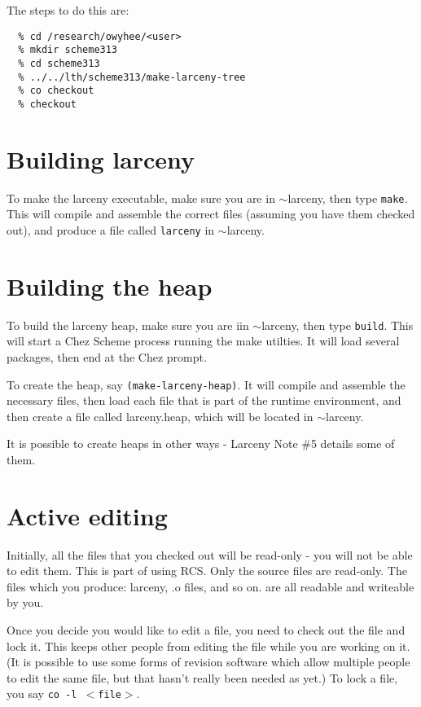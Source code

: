 The steps to do this are:
\begin{verbatim}
  % cd /research/owyhee/<user>
  % mkdir scheme313
  % cd scheme313
  % ../../lth/scheme313/make-larceny-tree
  % co checkout
  % checkout
\end{verbatim}

\section{Building larceny}

To make the larceny executable, make sure you are in $\sim$larceny,
then type {\tt make}.   This will compile and assemble the correct
files (assuming you have them checked out), and produce a file called
{\tt larceny} in $\sim$larceny.

\section{Building the heap}

To build the larceny heap, make sure you are iin $\sim$larceny, 
then type {\tt build}.  This will start a Chez Scheme process running
the make utilties.  It will load several packages, then end at
the Chez prompt.

To create the heap, say {\tt (make-larceny-heap)}.  It will compile
and assemble the necessary files, then load each file that is part
of the runtime environment, and then create a file called larceny.heap, 
which will be located in $\sim$larceny.

It is possible to create heaps in other ways - Larceny Note \#5 details
some of them.

\section{Active editing}

Initially, all the files that you checked out will be read-only - you 
will not be able to edit them.  This is part of using RCS.  Only 
the source files are read-only.  The files which you produce: larceny,
.o files, and so on. are all readable and writeable by you.

Once you decide you would like to edit a file, you need to check out the
file and lock it.  This keeps other people from editing the file while
you are working on it.  (It is possible to use some forms of revision
software which allow multiple people to edit the same file, but that
hasn't really been needed as yet.)  To lock a file, you say 
{\tt co -l $<$file$>$}.  

